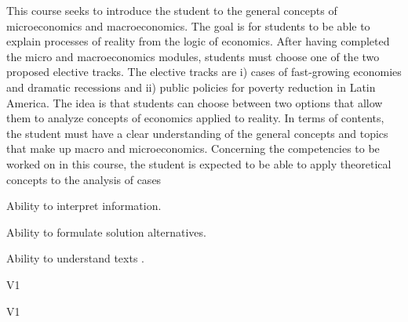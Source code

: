 \begin{syllabus}


\begin{justification}
This course seeks to introduce the student to the general concepts of microeconomics and macroeconomics. The goal is for students to be able to explain processes of reality from the logic of economics. After having completed the micro and macroeconomics modules, students must choose one of the two proposed elective tracks.
The elective tracks are i) cases of fast-growing economies and dramatic recessions and ii) public policies for poverty reduction in Latin America. The idea is that students can choose between two options that allow them to analyze concepts of economics applied to reality. In terms of contents, the student must have a clear understanding of the general concepts and topics that make up macro and microeconomics. Concerning the competencies to be worked on in this course, the student is expected to be able to apply theoretical concepts to the analysis of cases
\end{justification}

\begin{goals}
\item Ability to interpret information.
\item Ability to formulate solution alternatives.
\item Ability to understand texts .
\end{goals}

\begin{outcomes}{V1}
    \item {} %
    \item {} %
    \item {} %
    \item {} %

\end{outcomes}

\begin{competences}{V1}
    \item {}
    \item {}
    \item {}
    \item {}
\end{competences}


\end{syllabus}
